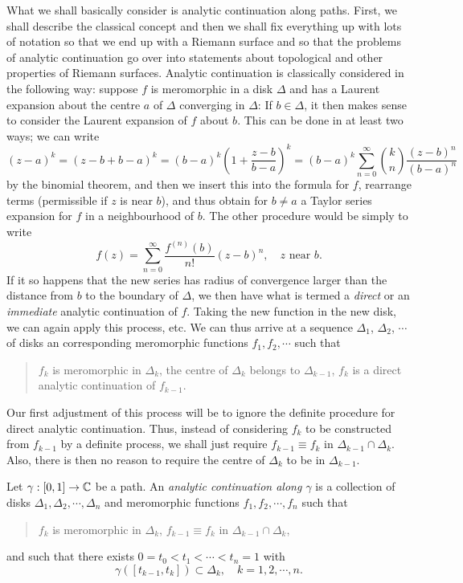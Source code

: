 \documentclass[a4paper,11pt]{article}
\begin{document}
What we shall basically consider is analytic continuation along
paths.  First, we shall describe the classical concept and then we
shall fix everything up with lots of notation so that we end up with a
Riemann surface and so that the problems of analytic continuation go
over into statements about topological and other properties of Riemann
surfaces.  Analytic continuation is classically considered in the
following way: suppose $f$ is meromorphic in a disk $\Delta$ and has a
Laurent expansion about the centre $a$ of $\Delta$ converging in
$\Delta$:
If $b \in \Delta$, it then makes sense to consider the Laurent
expansion of $f$ about $b$.  This can be done in at least two ways; we
can write
$$
(z-a)^k = (z-b + b-a)^k
= (b-a)^k (1 + \frac{z-b}{b-a})^k
= (b-a)^k \sum_{n=0}^{\infty} \binom{k}{n} \frac{(z-b)^n}{(b-a)^n}
$$
by the binomial theorem, and then we insert this into the formula for
$f$, rearrange terms (permissible if $z$ is near $b$), and thus obtain
for $b \ne a$ a Taylor series expansion for $f$ in a neighbourhood of
$b$.  The other procedure would be simply to write
$$
f(z) = \sum_{n=0}^{\infty} \frac{f^{(n)}(b)}{n!}(z-b)^n,\quad
z \text{ near } b.
$$
If it so happens that the new series has radius of convergence larger
than the distance from $b$ to the boundary of $\Delta$, we then have
what is termed a \emph{direct} or an \emph{immediate} analytic
continuation of $f$. Taking the new function in the new disk, we can
again apply this process, etc.  We can thus arrive at a sequence
$\Delta_1$, $\Delta_2$, $\cdots$ of disks an corresponding meromorphic
functions $f_1, f_2, \cdots$ such that
\begin{quote}
  $f_k$ is meromorphic in $\Delta_k$, the centre of $\Delta_k$ belongs
  to $\Delta_{k-1}$, $f_k$ is a direct analytic continuation of
  $f_{k-1}$.
\end{quote}
Our first adjustment of this process will be to ignore the definite
procedure for direct analytic continuation.  Thus, instead of
considering $f_k$ to be constructed from $f_{k-1}$ by a definite
process, we shall just require $f_{k-1} \equiv f_k$ in $\Delta_{k-1}
\cap \Delta_k$.  Also, there is then no reason to require the centre
of $\Delta_k$ to be in $\Delta_{k-1}$.

\begin{defn}
  \label{def:1}
  Let $\gamma :[0,1] \to {\mathbb C}$ be a path.  An \emph{analytic
    continuation along $\gamma$} is a collection of disks $\Delta_1,
  \Delta_2, \cdots, \Delta_n$ and meromorphic functions $f_1, f_2,
  \cdots, f_n$ such that
  \begin{quote}
    $f_k$ is meromorphic in $\Delta_k$, $f_{k-1} \equiv f_k$ in
    $\Delta_{k-1} \cap \Delta_k$,
  \end{quote}
  and such that there exists $0 = t_0 < t_1 < \cdots < t_n = 1$ with
  $$
  \gamma([t_{k-1},t_k]) \subset \Delta_k,\quad k = 1,2,\cdots, n.
  $$
\end{defn}
\end{document}
